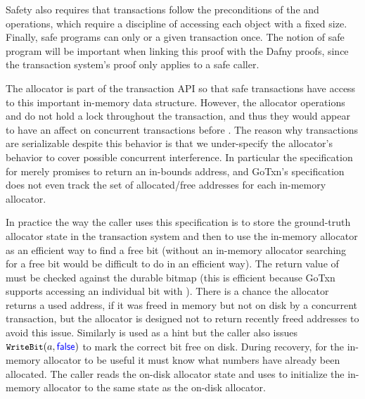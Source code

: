 Safety also requires that transactions follow the preconditions of the 
and  operations, which require a discipline of accessing each object
with a fixed size. Finally, safe programs can only  or  a
given transaction once. The notion of safe program will be important when
linking this proof with the Dafny proofs, since the transaction system's proof
only applies to a safe caller.

The allocator is part of the transaction API so that safe transactions have
access to this important in-memory data structure. However, the allocator
operations  and  do not hold a lock throughout the
transaction, and thus they would appear to have an affect on concurrent
transactions before . The reason why transactions are serializable
despite this behavior is that we under-specify the allocator's behavior to cover
possible concurrent interference. In particular the specification for 
merely promises to return an in-bounds address, and GoTxn's specification does
not even track the set of allocated/free addresses for each in-memory allocator.

In practice the way the caller uses this specification is to store the
ground-truth allocator state in the transaction system and then to use the
in-memory allocator as an efficient way to find a free bit (without an in-memory
allocator searching for a free bit would be difficult to do in an efficient
way). The return value of  must be checked against the durable bitmap
(this is efficient because GoTxn supports accessing an individual bit with
). There is a chance the allocator returns a used address, if it was
freed in memory but not on disk by a concurrent transaction, but the allocator
is designed not to return recently freed addresses to avoid this issue.
Similarly  is used as a hint but the caller also issues
$\cc{WriteBit}(a, \goosefalse)$ to mark the correct bit free on disk. During
recovery, for the in-memory allocator to be useful it must know what numbers
have already been allocated. The caller reads the on-disk allocator state and
uses  to initialize the in-memory allocator to the same state as
the on-disk allocator.
